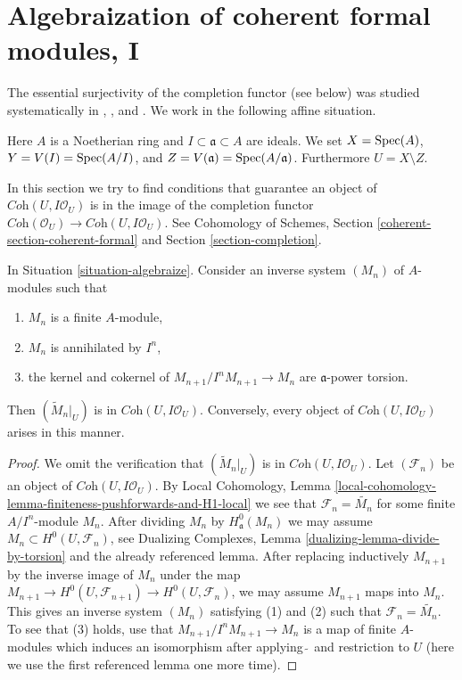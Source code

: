 \section{Algebraization of coherent formal modules, I}
\label{section-algebraization-modules}

\noindent
The essential surjectivity of the completion functor (see below)
was studied systematically in
\cite{SGA2}, \cite{MRaynaud-book}, and \cite{MRaynaud-paper}.
We work in the following affine situation.

\begin{situation}
\label{situation-algebraize}
Here $A$ is a Noetherian ring and $I \subset \mathfrak a \subset A$ are ideals.
We set $X = \mathop{\mathrm{Spec}}(A)$, $Y = V(I) = \mathop{\mathrm{Spec}}(A/I)$, and
$Z = V(\mathfrak a) = \mathop{\mathrm{Spec}}(A/\mathfrak a)$. Furthermore $U = X \setminus Z$.
\end{situation}

\noindent
In this section we try to find conditions that guarantee an object
of $\textit{Coh}(U, I\mathcal{O}_U)$ is in the image of the completion functor
$\textit{Coh}(\mathcal{O}_U) \to \textit{Coh}(U, I\mathcal{O}_U)$.
See Cohomology of Schemes, Section \ref{coherent-section-coherent-formal} and
Section \ref{section-completion}.

\begin{lemma}
\label{lemma-system-of-modules}
In Situation \ref{situation-algebraize}.
Consider an inverse system $(M_n)$ of $A$-modules such
that
\begin{enumerate}
\item $M_n$ is a finite $A$-module,
\item $M_n$ is annihilated by $I^n$,
\item the kernel and cokernel of $M_{n + 1}/I^nM_{n + 1} \to M_n$
are $\mathfrak a$-power torsion.
\end{enumerate}
Then $(\widetilde{M}_n|_U)$ is in $\textit{Coh}(U, I\mathcal{O}_U)$.
Conversely, every object of $\textit{Coh}(U, I\mathcal{O}_U)$
arises in this manner.
\end{lemma}

\begin{proof}
We omit the verification that $(\widetilde{M}_n|_U)$ is in
$\textit{Coh}(U, I\mathcal{O}_U)$. Let $(\mathcal{F}_n)$
be an object of $\textit{Coh}(U, I\mathcal{O}_U)$.
By Local Cohomology, Lemma
\ref{local-cohomology-lemma-finiteness-pushforwards-and-H1-local}
we see that $\mathcal{F}_n = \widetilde{M_n}$ for some finite
$A/I^n$-module $M_n$. After dividing $M_n$ by $H^0_\mathfrak a(M_n)$
we may assume $M_n \subset H^0(U, \mathcal{F}_n)$, see
Dualizing Complexes, Lemma \ref{dualizing-lemma-divide-by-torsion}
and the already referenced lemma.
After replacing inductively $M_{n + 1}$ by the inverse image
of $M_n$ under the map $M_{n + 1} \to H^0(U, \mathcal{F}_{n + 1})
\to H^0(U, \mathcal{F}_n)$, we may assume $M_{n + 1}$ maps into
$M_n$. This gives an inverse system $(M_n)$ satisfying (1) and (2)
such that $\mathcal{F}_n = \widetilde{M_n}$. To see that (3)
holds, use that $M_{n + 1}/I^nM_{n + 1} \to M_n$ is a map
of finite $A$-modules which induces an isomorphism after
applying $\widetilde{\ }$ and restriction to $U$
(here we use the first referenced lemma one more time).
\end{proof}

